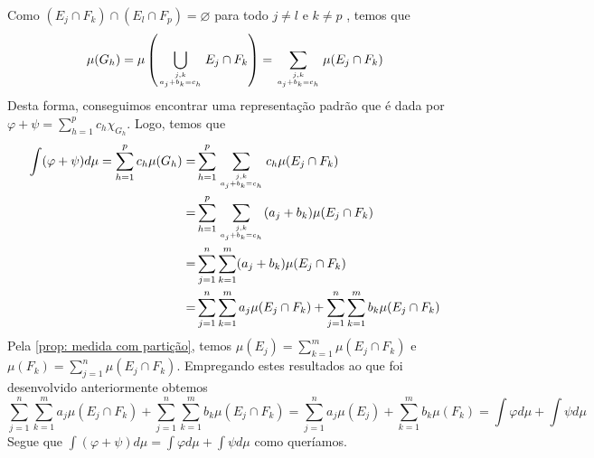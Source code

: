 \begin{prova}
    Como $(E_j \cap F_k) \cap (E_l \cap F_p)= \varnothing$ para todo $j \neq l$ e $k \neq p$ , temos que 
    $$
    \mu(G_h) = \mu\left(\bigcup_{
        j,k\atop
        a_j + b_k = c_h} E_j \cap F_k
    \right)
    = 
    \sum_{
        j,k\atop
        a_j + b_k = c_h} \mu(E_j \cap F_k)
    $$
    Desta forma, conseguimos encontrar uma representação padrão que é dada por 
    $\displaystyle \varphi + \psi = \sum_{h =1}^p c_h\chi_{G_h}$.
    Logo, temos que 
    \begin{align*}
        \int(\varphi + \psi) d\mu = \sum_{h =1}^p c_h\mu(G_h)
        = & 
        \sum_{h = 1}^p\sum_{ j,k\atop a_j + b_k = c_h}c_h \mu(E_j \cap F_k)\\
        = &
        \sum_{h = 1}^p\sum_{ j,k\atop a_j + b_k = c_h}(a_j + b_k) \mu(E_j \cap F_k)\\
        = &
        \sum_{j = 1}^n\sum_{k = 1}^m(a_j + b_k) \mu(E_j \cap F_k)\\
        = &
        \sum_{j = 1}^n\sum_{k = 1}^m a_j \mu(E_j \cap F_k) + \sum_{j = 1}^n\sum_{k = 1}^m b_k \mu(E_j \cap F_k)
    \end{align*}
	Pela \ref{prop: medida com partição}, temos
	$
	\displaystyle
	\mu(E_j) = \sum_{k = 1}^m \mu(E_j \cap F_k)
	$
    e
    $\displaystyle \mu(F_k) = \sum_{j = 1}^n \mu(E_j \cap F_k)$.
    Empregando estes resultados ao que foi desenvolvido anteriormente obtemos
    $$
    \sum_{j = 1}^n\sum_{k = 1}^m a_j \mu(E_j \cap F_k) + \sum_{j = 1}^n\sum_{k = 1}^m b_k \mu(E_j \cap F_k)
    =
    \sum_{j = 1}^n a_j \mu(E_j) + \sum_{k = 1}^m b_k \mu(F_k)
    =
    \int \varphi d\mu + \int \psi d\mu
    $$
    Segue que $\displaystyle\int(\varphi + \psi) d\mu = \int \varphi d\mu + \int \psi d\mu$ como queríamos.
\end{prova}



